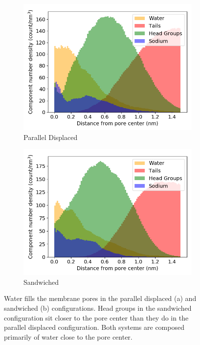 \documentclass[journal=jpcbfk,manusciprt=article]{achemso}
\begin{document}
  \begin{figure}
  \centering 
  \begin{subfigure}{0.45\textwidth}
        \includegraphics[width=1\linewidth]{offset_solvated_density.png}
        \caption{Parallel Displaced}
        \label{fig:offset_solvated_density}
  \end{subfigure}
  \begin{subfigure}{0.45\textwidth}
        \includegraphics[width=1\linewidth]{layered_solvated_density.png}
        \caption{Sandwiched}
        \label{fig:layered_solvated_density}
  \end{subfigure}
  \caption{Water fills the membrane pores in the parallel displaced (a) and
	  sandwiched (b) configurations. Head groups in the sandwiched configuration sit
	  closer to the pore center than they do in the parallel displaced configuration.
	  Both systems are composed primarily of water close to the pore center.}
  \label{fig:water_density}
  \end{figure}
\end{document}
